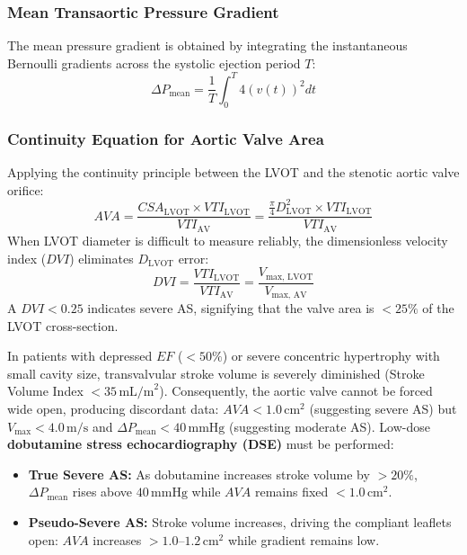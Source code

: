 \documentclass[11pt,a4paper]{article}
\begin{document}
\subsubsection{Mean Transaortic Pressure Gradient}
The mean pressure gradient is obtained by integrating the instantaneous Bernoulli gradients across the systolic ejection period $T$:
\begin{equation}
    \Delta P_{\text{mean}} = \frac{1}{T} \int_0^T 4 \left( v(t) \right)^2 dt
\end{equation}

\subsubsection{Continuity Equation for Aortic Valve Area}
Applying the continuity principle between the LVOT and the stenotic aortic valve orifice:
\begin{equation}
    AVA = \frac{CSA_{\text{LVOT}} \times VTI_{\text{LVOT}}}{VTI_{\text{AV}}} = \frac{\frac{\pi}{4} D_{\text{LVOT}}^2 \times VTI_{\text{LVOT}}}{VTI_{\text{AV}}}
\end{equation}
When LVOT diameter is difficult to measure reliably, the dimensionless velocity index ($DVI$) eliminates $D_{\text{LVOT}}$ error:
\begin{equation}
    DVI = \frac{VTI_{\text{LVOT}}}{VTI_{\text{AV}}} = \frac{V_{\text{max, LVOT}}}{V_{\text{max, AV}}}
\end{equation}
A $DVI < 0.25$ indicates severe AS, signifying that the valve area is $< 25\%$ of the LVOT cross-section.

\begin{clinicalpearl}
In patients with depressed $EF$ ($< 50\%$) or severe concentric hypertrophy with small cavity size, transvalvular stroke volume is severely diminished (Stroke Volume Index $< 35\,\text{mL/m}^2$). Consequently, the aortic valve cannot be forced wide open, producing discordant data: $AVA < 1.0\,\text{cm}^2$ (suggesting severe AS) but $V_{\text{max}} < 4.0\,\text{m/s}$ and $\Delta P_{\text{mean}} < 40\,\text{mmHg}$ (suggesting moderate AS). Low-dose \textbf{dobutamine stress echocardiography (DSE)} must be performed:
\begin{itemize}[leftmargin=*]
    \item \textbf{True Severe AS:} As dobutamine increases stroke volume by $> 20\%$, $\Delta P_{\text{mean}}$ rises above $40\,\text{mmHg}$ while $AVA$ remains fixed $< 1.0\,\text{cm}^2$.
    \item \textbf{Pseudo-Severe AS:} Stroke volume increases, driving the compliant leaflets open: $AVA$ increases $> 1.0\text{--}1.2\,\text{cm}^2$ while gradient remains low.
\end{itemize}
\end{clinicalpearl}
\end{document}
